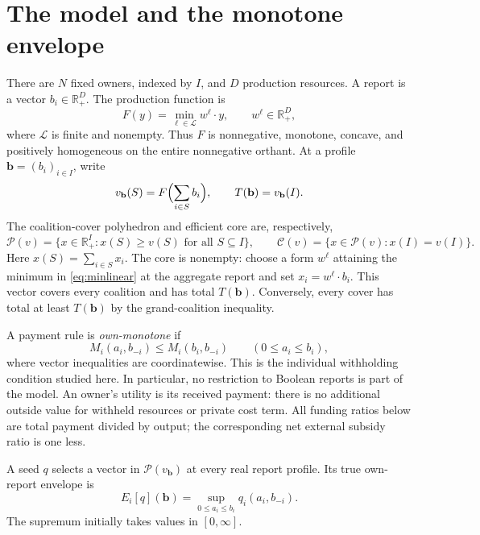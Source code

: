 \section{The model and the monotone envelope}
\label{sec:model}

There are $N$ fixed owners, indexed by $I$, and $D$ production resources.
A report is a vector $b_i\in\mathbb R_+^D$.  The production function is
\begin{equation}
 F(y)=\min_{\ell\in\mathcal L} w^\ell\cdot y,
 \qquad w^\ell\in\mathbb R_+^D,
 \label{eq:minlinear}
\end{equation}
where $\mathcal L$ is finite and nonempty.  Thus $F$ is nonnegative,
monotone, concave, and positively homogeneous on the entire nonnegative
orthant.  At a profile $\mathbf b=(b_i)_{i\in I}$, write
\[
 v_{\mathbf b}(S)=F\Bigl(\sum_{i\in S}b_i\Bigr),
 \qquad T(\mathbf b)=v_{\mathbf b}(I).
\]
The coalition-cover polyhedron and efficient core are, respectively,
\[
 \mathcal P(v)=\{x\in\mathbb R_+^I:x(S)\ge v(S)\text{ for all }S\subseteq I\},
 \qquad
 \mathcal C(v)=\{x\in\mathcal P(v):x(I)=v(I)\}.
\]
Here $x(S)=\sum_{i\in S}x_i$.  The core is nonempty: choose a form
$w^\ell$ attaining the minimum in \eqref{eq:minlinear} at the aggregate
report and set $x_i=w^\ell\cdot b_i$.  This vector covers every coalition
and has total $T(\mathbf b)$.  Conversely, every cover has total at least
$T(\mathbf b)$ by the grand-coalition inequality.

A payment rule is \emph{own-monotone} if
\[
 M_i(a_i,b_{-i})\le M_i(b_i,b_{-i})\qquad(0\le a_i\le b_i),
\]
where vector inequalities are coordinatewise.  This is the individual
withholding condition studied here.  In particular, no restriction to
Boolean reports is part of the model.  An owner's utility is its received
payment: there is no additional outside value for withheld resources or
private cost term.  All funding ratios below are total payment divided by
output; the corresponding net external subsidy ratio is one less.

\begin{definition}
A seed $q$ selects a vector in $\mathcal P(v_{\mathbf b})$ at every real
report profile.  Its true own-report envelope is
\begin{equation}
 E_i[q](\mathbf b)=\sup_{0\le a_i\le b_i}q_i(a_i,b_{-i}).
 \label{eq:envelope}
\end{equation}
The supremum initially takes values in $[0,\infty]$.
\end{definition}

